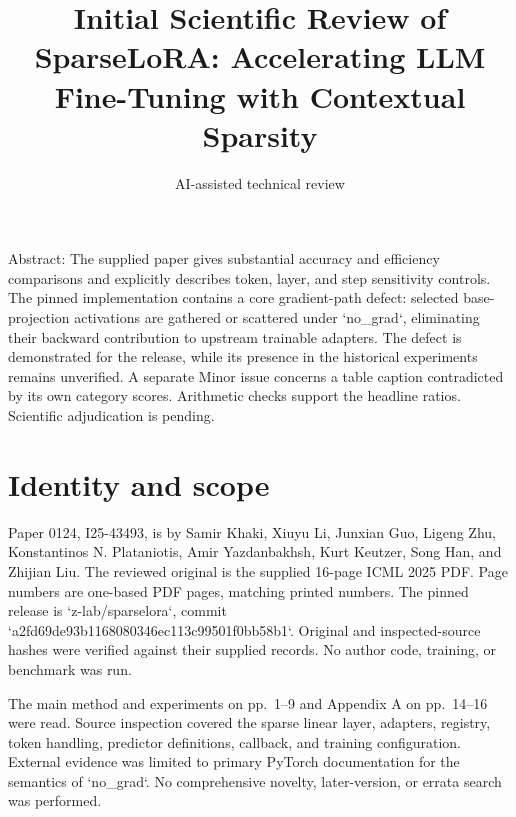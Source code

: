 \documentclass[10pt]{article}
\title{Initial Scientific Review of
SparseLoRA: Accelerating LLM Fine-Tuning
with Contextual Sparsity}
\author{AI-assisted technical review}
\date{}
\begin{document}
\maketitle
Abstract: The supplied paper gives substantial accuracy and efficiency comparisons and explicitly describes token, layer, and step sensitivity controls. The pinned implementation contains a core gradient-path defect: selected base-projection activations are gathered or scattered under `no\_grad`, eliminating their backward contribution to upstream trainable adapters. The defect is demonstrated for the release, while its presence in the historical experiments remains unverified. A separate Minor issue concerns a table caption contradicted by its own category scores. Arithmetic checks support the headline ratios. Scientific adjudication is pending.\par
\section*{Identity and scope}
Paper 0124, I25-43493, is by Samir Khaki, Xiuyu Li, Junxian Guo, Ligeng Zhu, Konstantinos N. Plataniotis, Amir Yazdanbakhsh, Kurt Keutzer, Song Han, and Zhijian Liu. The reviewed original is the supplied 16-page ICML 2025 PDF. Page numbers are one-based PDF pages, matching printed numbers. The pinned release is `z-lab/sparselora`, commit `a2fd69de93b1168080346ec113c99501f0bb58b1`. Original and inspected-source hashes were verified against their supplied records. No author code, training, or benchmark was run.\par
The main method and experiments on pp. 1–9 and Appendix A on pp. 14–16 were read. Source inspection covered the sparse linear layer, adapters, registry, token handling, predictor definitions, callback, and training configuration. External evidence was limited to primary PyTorch documentation for the semantics of `no\_grad`. No comprehensive novelty, later-version, or errata search was performed.\par
\end{document}
